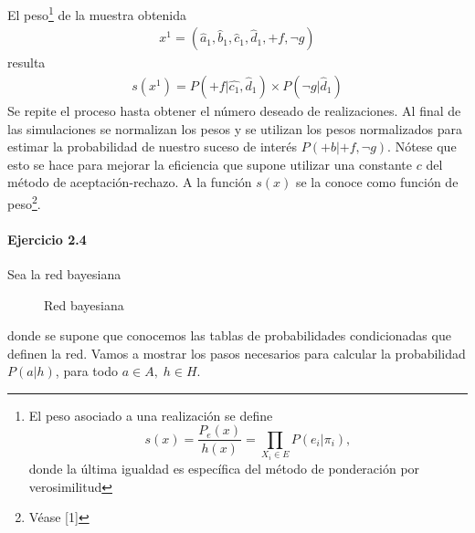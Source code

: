 \documentclass[12pt,a4paper]{article}
\begin{document}
\begin{description}
    El peso\footnote{El peso asociado a una realización se define $$ s(x) = \frac{P_e(x)}{h(x)} = \prod_{X_i \in E} P(e_i | \pi_i), $$ donde la última igualdad es específica del método de ponderación por verosimilitud} de la muestra obtenida 
    \begin{align*}
        x^1 = (\hat{a}_1, \hat{b}_1, \hat{c}_1, \hat{d}_1, +f, \neg g)
    \end{align*} 
    resulta 
    \begin{align*}
        s(x^1) = P(+f | \hat{c_1}, \hat{d}_1) \times P(\neg g | \hat{d}_1)
    \end{align*}
    Se repite el proceso hasta obtener el número deseado de realizaciones. Al final de las simulaciones se normalizan los pesos y se utilizan los pesos normalizados para estimar la probabilidad de nuestro suceso de interés $P(+b | +f, \neg g)$. Nótese que esto se hace para mejorar la eficiencia que supone utilizar una constante $c$ del método de aceptación-rechazo. A la función $s(x)$ se la conoce como función de peso\footnote{Véase [1]}.
\end{description}
\newpage
\paragraph*{Ejercicio 2.4}
Sea la red bayesiana

\begin{figure}[h!]
    \centering
    \caption{Red bayesiana}\label{fig:red4}
\end{figure}
donde se supone que conocemos las tablas de probabilidades condicionadas que definen la red. Vamos a mostrar los pasos necesarios para calcular la probabilidad $P(a | h)$, para todo $a \in A, \; h \in H$. 
\end{document}
